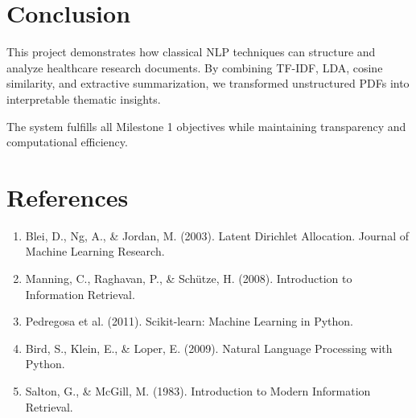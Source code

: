 \documentclass[12pt]{article}
\begin{document}
\section{Conclusion}

This project demonstrates how classical NLP techniques can structure and analyze healthcare research documents. By combining TF-IDF, LDA, cosine similarity, and extractive summarization, we transformed unstructured PDFs into interpretable thematic insights.

The system fulfills all Milestone 1 objectives while maintaining transparency and computational efficiency.

\section*{References}

\begin{enumerate}
    \item Blei, D., Ng, A., \& Jordan, M. (2003). Latent Dirichlet Allocation. Journal of Machine Learning Research.
    \item Manning, C., Raghavan, P., \& Schütze, H. (2008). Introduction to Information Retrieval.
    \item Pedregosa et al. (2011). Scikit-learn: Machine Learning in Python.
    \item Bird, S., Klein, E., \& Loper, E. (2009). Natural Language Processing with Python.
    \item Salton, G., \& McGill, M. (1983). Introduction to Modern Information Retrieval.
\end{enumerate}
\end{document}
